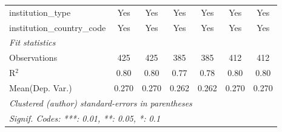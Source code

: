 \begin{tabular}{lcccccc}
   institution\_type                  & Yes     & Yes     & Yes         & Yes         & Yes    & Yes\\  
   institution\_country\_code         & Yes     & Yes     & Yes         & Yes         & Yes    & Yes\\  
   \midrule
   \emph{Fit statistics}\\
   Observations                       & 425     & 425     & 385         & 385         & 412    & 412\\  
   R$^2$                              & 0.80    & 0.80    & 0.77        & 0.78        & 0.80   & 0.80\\  
Mean(Dep. Var.) & 0.270 & 0.270 & 0.262 & 0.262 & 0.270 & 0.270 \\
   \midrule \midrule
   \multicolumn{7}{l}{\emph{Clustered (author) standard-errors in parentheses}}\\
   \multicolumn{7}{l}{\emph{Signif. Codes: ***: 0.01, **: 0.05, *: 0.1}}\\
\end{tabular}
\par\endgroup
